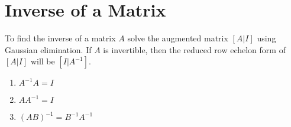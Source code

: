 \documentclass{article}
\begin{document}
\section{Inverse of a Matrix}
To find the inverse of a matrix $A$ solve the augmented matrix $[A|I]$ using Gaussian elimination. If $A$ is invertible, then the reduced row echelon form of $[A|I]$ will be $[I|A^{-1}]$.
\begin{enumerate}
\item $A^{-1}A = I$
\item $AA^{-1} = I$
\item $(AB)^{-1} = B^{-1}A^{-1}$
\end{enumerate}
\end{document}
